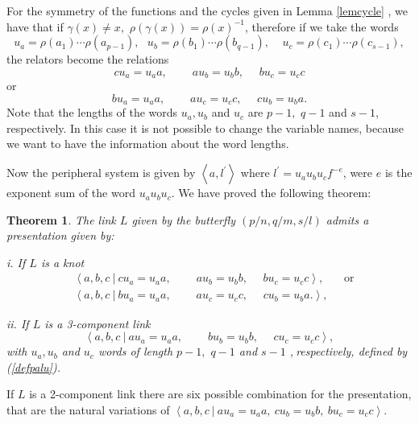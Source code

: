 \documentclass[12pt]{article}%
\newtheorem{theorem}{Theorem}
\begin{document}
For the symmetry of the functions and the cycles given in Lemma \ref{lemcycle}%
, we have that if $\gamma\left(  x\right)  \neq x,$ $\rho\left(  \gamma\left(
x\right)  \right)  =\rho\left(  x\right)  ^{-1}$, therefore if we take the
words%
\begin{equation}
u_{a}=\rho\left(  a_{1}\right)  \cdots\rho\left(  a_{p-1}\right)
,\ \ \ u_{b}=\rho\left(  b_{1}\right)  \cdots\rho\left(  b_{q-1}\right)
,\ \ \ \ \ u_{c}=\rho\left(  c_{1}\right)  \cdots\rho\left(  c_{s-1}\right)  ,
\label{defpalu}%
\end{equation}
the relators become the relations
\[
cu_{a}=u_{a}a,\ \ \ \ \ \ \ \ \ \ au_{b}=u_{b}b,\ \ \ \ \ \ bu_{c}=u_{c}c
\]
or%
\[
bu_{a}=u_{a}a,\ \ \ \ \ \ \ \ \ \ au_{c}=u_{c}c,\ \ \ \ \ \ cu_{b}=u_{b}a.
\]
Note that the lengths of the words $u_{a},u_{b}$ and $u_{c}$ are $p-1,$ $q-1$
and $s-1$,$\ $respectively. In this case it is not possible to change the
variable names, because we want to have the information about the word lengths.

Now the peripheral system is given by $\left\langle a,l^{\prime}\right\rangle
$ where $l^{\prime}=u_{a}u_{b}u_{c}f^{-e}$, were $e$ is the exponent sum of
the word $u_{a}u_{b}u_{c}$. We have proved the following theorem:

\begin{theorem}
\label{presunder}The link $L$ given by the butterfly $\left(
p/n,q/m,s/l\right)  $ admits a presentation given by:

i. If $L$ is a knot
\begin{align*}
&  \left\langle a,b,c\ |\ cu_{a}=u_{a}a,\ \ \ \ \ \ \ \ \ \ au_{b}%
=u_{b}b,\ \ \ \ \ \ bu_{c}=u_{c}c\right\rangle ,\ \ \ \ \ \ \ \ \text{or}\\
&  \left\langle a,b,c\ |\ bu_{a}=u_{a}a,\ \ \ \ \ \ \ \ \ \ au_{c}%
=u_{c}c,\ \ \ \ \ \ cu_{b}=u_{b}a.\right\rangle ,
\end{align*}


ii. If $L$ is a 3-component link
\[
\left\langle a,b,c\ |\ au_{a}=u_{a}a,\ \ \ \ \ \ \ \ \ \ bu_{b}=u_{b}%
b,\ \ \ \ \ \ cu_{c}=u_{c}c\right\rangle ,
\]
with $u_{a},u_{b}$ and $u_{c}$ words of length $p-1,$ $q-1$ and $s-1$%
,$\ $respectively, defined by (\ref{defpalu}).
\end{theorem}

If $L$ is a 2-component link there are six possible combination for the
presentation, that are the natural variations of $\left\langle
a,b,c\ |\ au_{a}=u_{a}a,\ cu_{b}=u_{b}b,\ bu_{c}=u_{c}c\right\rangle .$
\end{document}
